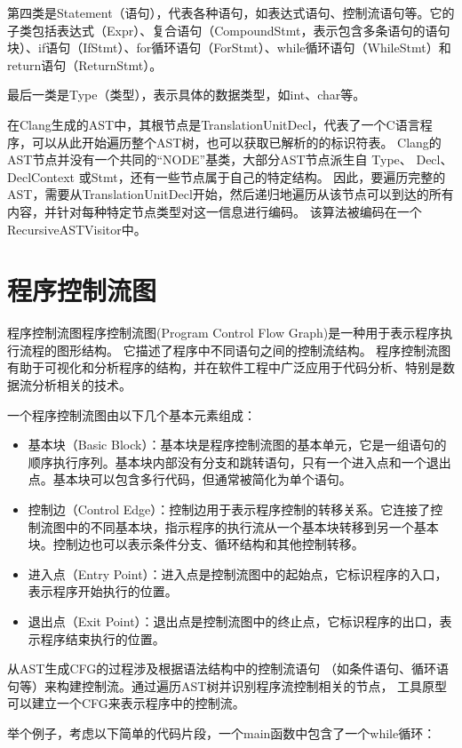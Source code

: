 第四类是Statement（语句），代表各种语句，如表达式语句、控制流语句等。它的子类包括表达式（Expr）、复合语句（CompoundStmt，表示包含多条语句的语句块）、if语句（IfStmt）、for循环语句（ForStmt）、while循环语句（WhileStmt）和return语句（ReturnStmt）。

最后一类是Type（类型），表示具体的数据类型，如int、char等。

在Clang生成的AST中，其根节点是TranslationUnitDecl，代表了一个C语言程序，可以从此开始遍历整个AST树，也可以获取已解析的的标识符表。
Clang的AST节点并没有一个共同的“NODE”基类，大部分AST节点派生自 Type、 Decl、 DeclContext 或Stmt，还有一些节点属于自己的特定结构。
因此，要遍历完整的AST，需要从TranslationUnitDecl开始，然后递归地遍历从该节点可以到达的所有内容，并针对每种特定节点类型对这一信息进行编码。
该算法被编码在一个RecursiveASTVisitor中。
\section{程序控制流图}
程序控制流图程序控制流图(Program Control Flow Graph)是一种用于表示程序执行流程的图形结构。
它描述了程序中不同语句之间的控制流结构。
程序控制流图有助于可视化和分析程序的结构，并在软件工程中广泛应用于代码分析、特别是数据流分析相关的技术。

一个程序控制流图由以下几个基本元素组成：
\begin{itemize}
	\item 基本块（Basic Block）：基本块是程序控制流图的基本单元，它是一组语句的顺序执行序列。基本块内部没有分支和跳转语句，只有一个进入点和一个退出点。基本块可以包含多行代码，但通常被简化为单个语句。
    \item 控制边（Control Edge）：控制边用于表示程序控制的转移关系。它连接了控制流图中的不同基本块，指示程序的执行流从一个基本块转移到另一个基本块。控制边也可以表示条件分支、循环结构和其他控制转移。
    \item 进入点（Entry Point）：进入点是控制流图中的起始点，它标识程序的入口，表示程序开始执行的位置。
    \item 退出点（Exit Point）：退出点是控制流图中的终止点，它标识程序的出口，表示程序结束执行的位置。
\end{itemize}

从AST生成CFG的过程涉及根据语法结构中的控制流语句
（如条件语句、循环语句等）来构建控制流。通过遍历AST树并识别程序流控制相关的节点，
工具原型可以建立一个CFG来表示程序中的控制流。

举个例子，考虑以下简单的代码片段，一个main函数中包含了一个while循环：\\

